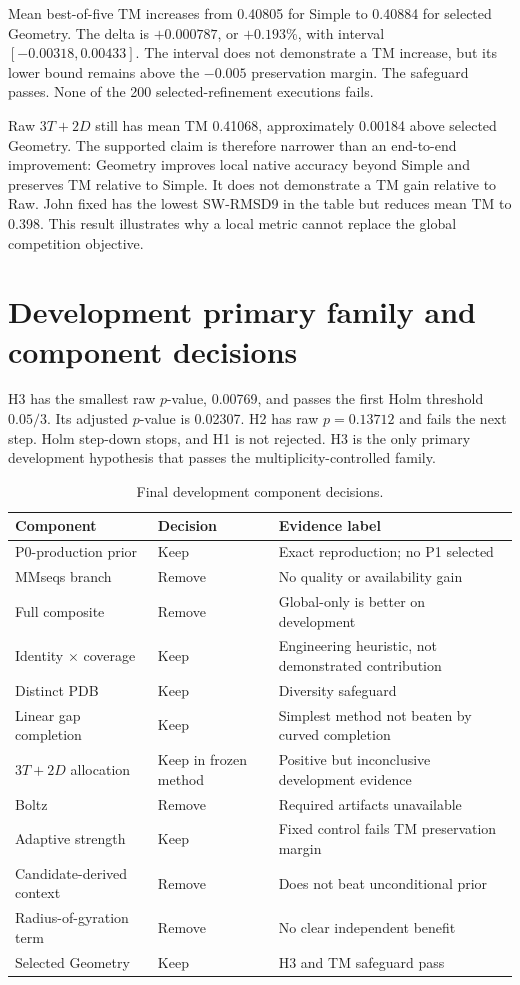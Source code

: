 \documentclass[12pt,a4paper,oneside]{report}
\begin{document}
Mean best-of-five TM increases from 0.40805 for Simple to 0.40884 for selected
Geometry. The delta is $+0.000787$, or $+0.193\%$, with interval
$[-0.00318,0.00433]$. The interval does not demonstrate a TM increase, but its lower
bound remains above the $-0.005$ preservation margin. The safeguard passes. None of
the 200 selected-refinement executions fails.

Raw $3T+2D$ still has mean TM 0.41068, approximately 0.00184 above selected Geometry.
The supported claim is therefore narrower than an end-to-end improvement: Geometry
improves local native accuracy beyond Simple and preserves TM relative to Simple. It
does not demonstrate a TM gain relative to Raw. John fixed has the lowest SW-RMSD9 in
the table but reduces mean TM to 0.398. This result illustrates why a local metric
cannot replace the global competition objective.

\section{Development primary family and component decisions}

H3 has the smallest raw $p$-value, 0.00769, and passes the first Holm threshold
$0.05/3$. Its adjusted $p$-value is 0.02307. H2 has raw $p=0.13712$ and fails the next
step. Holm step-down stops, and H1 is not rejected. H3 is the only primary development
hypothesis that passes the multiplicity-controlled family.

\begin{table}[H]
\centering
\caption{Final development component decisions.}
\begin{tabularx}{\textwidth}{p{4.4cm}p{3.0cm}X}
\toprule
Component & Decision & Evidence label \\
\midrule
P0-production prior & Keep & Exact reproduction; no P1 selected \\
MMseqs branch & Remove & No quality or availability gain \\
Full composite & Remove & Global-only is better on development \\
Identity $\times$ coverage & Keep & Engineering heuristic, not demonstrated contribution \\
Distinct PDB & Keep & Diversity safeguard \\
Linear gap completion & Keep & Simplest method not beaten by curved completion \\
$3T+2D$ allocation & Keep in frozen method & Positive but inconclusive development evidence \\
Boltz & Remove & Required artifacts unavailable \\
Adaptive strength & Keep & Fixed control fails TM preservation margin \\
Candidate-derived context & Remove & Does not beat unconditional prior \\
Radius-of-gyration term & Remove & No clear independent benefit \\
Selected Geometry & Keep & H3 and TM safeguard pass \\
\bottomrule
\end{tabularx}
\end{table}
\end{document}
